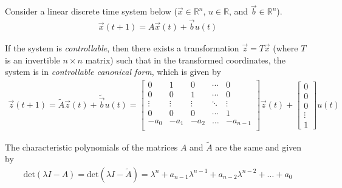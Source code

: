 
Consider a linear discrete time system below ($\vec{x} \in
\mathbb{R}^n$, $u \in \mathbb{R}$, and $\vec{b} \in \mathbb{R}^n$).
\begin{align*}
\vec{x}(t+1) = A \vec{x}(t) + \vec{b} u(t)
\end{align*}

If the system is \textit{controllable},
then there exists a transformation $\vec{z} = T\vec{x}$ (where $T$ is an invertible $n\times n$ matrix)
such that in the transformed coordinates, the system is in
\textit{controllable canonical form}, which is given by
\begin{align*}
\vec{z}(t+1) = \widetilde{A}\vec{z}(t) + \widetilde{\vec{b}} u(t) = \begin{bmatrix}
0 & 1 & 0 & \cdots & 0 \\
0 & 0 & 1 & \cdots & 0 \\
\vdots & \vdots & \vdots  & \ddots & \vdots \\
 0 & 0 & 0 & \cdots & 1 \\
 -a_0 & -a_{1} & -a_{2} & \ldots & -a_{n-1} \\
\end{bmatrix} 
\vec{z}(t) +
\begin{bmatrix}
0 \\ 0 \\ 0 \\ \vdots \\ 1
\end{bmatrix}
u(t)
\end{align*}

The characteristic polynomials of the matrices $A$ and $\widetilde{A}$ are the same and given by
\begin{align}\label{eq:poly}
\mbox{det}(\lambda I - A ) = \mbox{det}(\lambda I - \widetilde{A} )
= \lambda^n  + a_{n-1} \lambda^{n-1} + a_{n-2} \lambda^{n-2} + \ldots + a_0
\end{align}

